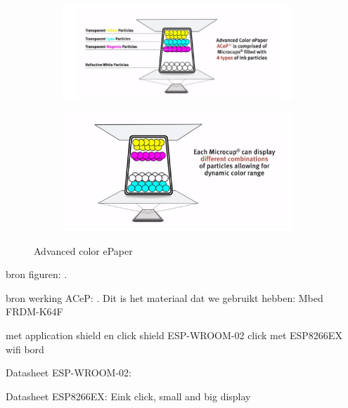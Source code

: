 \documentclass[a4paper,kul]{kulakarticle} %
\begin{document}
\begin{figure}[h]
	\centering
	\begin{subfigure}{.5\textwidth}
		\centering
		\includegraphics[width=0.95\textwidth]{ACeP1}
		\label{fig:subACeP}
	\end{subfigure}%
	\begin{subfigure}{.5\textwidth}
		\centering
		\includegraphics[width=0.95\textwidth]{ACeP2}
		\label{fig:subACeP2}
	\end{subfigure}
	\caption{Advanced color ePaper}
	\label{fig:ACeP}
\end{figure}

bron figuren: \cite{E-ink}.

bron werking ACeP: \cite{ACeP}.
\newline
\newline
Dit is het materiaal dat we gebruikt hebben:
\newline
Mbed FRDM-K64F

met application shield en click shield
\newline
ESP-WROOM-02 click met ESP8266EX wifi bord

Datasheet ESP-WROOM-02: \cite{ESP-WROOM-02}

Datasheet ESP8266EX: \cite{ESP8266EX}
\newline
Eink click, small and big display

\newpage
\end{document}
